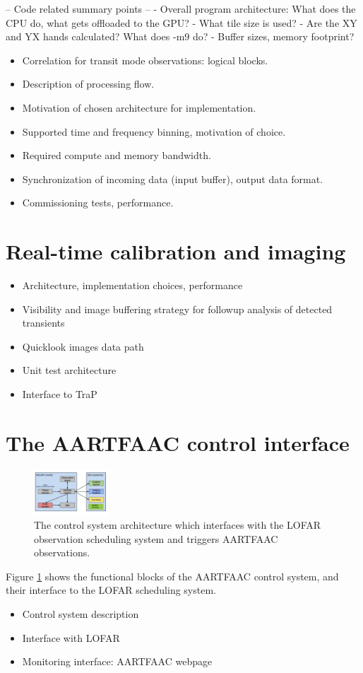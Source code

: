 \documentclass{aa}
\begin{document}
-- Code related summary points --
- Overall program architecture: What does the CPU do, what gets offloaded to the GPU?
- What tile size is used?
- Are the XY and YX hands calculated? What does -m9 do?
- Buffer sizes, memory footprint?


\begin {itemize}
 \item {Correlation for transit mode observations: logical blocks.}
 \item {Description of processing flow.} 
 \item {Motivation of chosen architecture for implementation.}
 \item {Supported time and frequency binning, motivation of choice.}
 \item {Required compute and memory bandwidth.}
 \item {Synchronization of incoming data (input buffer), output data format.}
 \item {Commissioning tests, performance.}
\end {itemize}

\section {\label{sec:calim} Real-time calibration and imaging}
\begin {itemize}
 \item {Architecture, implementation choices, performance}
 \item  {Visibility  and  image  buffering strategy  for  followup  analysis  of
   detected transients}
 \item {Quicklook images data path}
 \item {Unit test architecture}
 \item {Interface to TraP}
\end {itemize}

\section {\label{sec:acontrol} The AARTFAAC control interface}
\begin{figure}[htbp]
\centering
\includegraphics[width=0.25\textwidth]{Figs/control_sys.png}
\caption{The  control  system  architecture  which  interfaces  with  the  LOFAR
  observation scheduling system and triggers AARTFAAC observations.}
\label{fig:afaac_ctrl_sys}
\end{figure}
Figure  \ref{fig:afaac_ctrl_sys} shows  the  functional blocks  of the  AARTFAAC
control system, and their interface to the LOFAR scheduling system.
\begin {itemize}
 \item {Control system description}
 \item {Interface with LOFAR}
 \item {Monitoring interface: AARTFAAC webpage}
\end {itemize}
\end{document}

